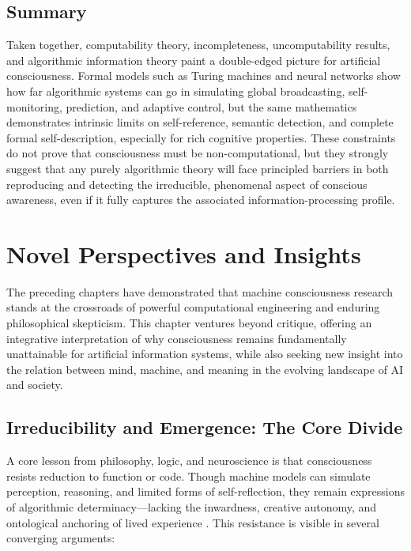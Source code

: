 \subsection{Summary}
\label{subsec:math_summary}

Taken together, computability theory, incompleteness, uncomputability results, and algorithmic information theory paint a double-edged picture for artificial consciousness. Formal models such as Turing machines and neural networks show how far algorithmic systems can go in simulating global broadcasting, self-monitoring, prediction, and adaptive control, but the same mathematics demonstrates intrinsic limits on self-reference, semantic detection, and complete formal self-description, especially for rich cognitive properties. These constraints do not prove that consciousness must be non-computational, but they strongly suggest that any purely algorithmic theory will face principled barriers in both reproducing and detecting the irreducible, phenomenal aspect of conscious awareness, even if it fully captures the associated information-processing profile.


\section{Novel Perspectives and Insights}
\label{sec:novel_perspectives}

The preceding chapters have demonstrated that machine consciousness research stands at the crossroads of powerful computational engineering and enduring philosophical skepticism. This chapter ventures beyond critique, offering an integrative interpretation of why consciousness remains fundamentally unattainable for artificial information systems, while also seeking new insight into the relation between mind, machine, and meaning in the evolving landscape of AI and society.

\subsection{Irreducibility and Emergence: The Core Divide}
\label{subsec:irreducibility_emergence}

A core lesson from philosophy, logic, and neuroscience is that consciousness resists reduction to function or code. Though machine models can simulate perception, reasoning, and limited forms of self-reflection, they remain expressions of algorithmic determinacy---lacking the inwardness, creative autonomy, and ontological anchoring of lived experience \cite{faggin2024irreducible,levine1983materialism,penrose1990emperors}. This resistance is visible in several converging arguments:

